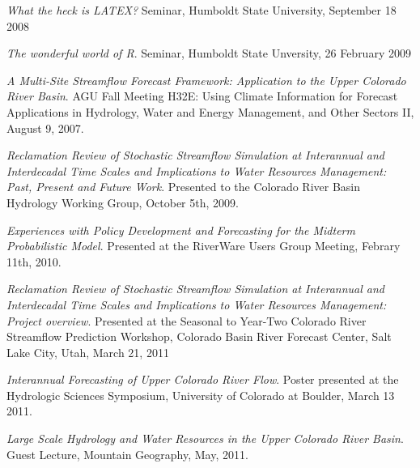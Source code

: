 \documentclass[10pt,a4paper]{scrartcl}
\begin{document}
\begin{cv}{}
        \begin{cvlist}{}\label{pres}
            \item \textit{What the heck is LATEX?} Seminar, Humboldt State University, September 18 2008
            \item \textit{The wonderful world of R}. Seminar, Humboldt State Unversity, 26 February 2009
            \item \textit{A Multi-Site Streamflow Forecast Framework: Application to the Upper Colorado River Basin}. AGU Fall Meeting H32E: Using Climate Information for Forecast Applications in Hydrology, Water and Energy Management, and Other Sectors II, August 9, 2007.
            \item \textit{Reclamation Review of Stochastic Streamflow Simulation at Interannual and Interdecadal Time Scales and Implications to Water Resources Management: Past, Present and Future Work}. Presented to the Colorado River Basin Hydrology Working Group, October 5th, 2009. 
            \item \textit{Experiences with Policy Development and Forecasting for the Midterm Probabilistic Model}. Presented at the RiverWare Users Group Meeting, Febrary 11th, 2010. 
            \item \textit{Reclamation Review of Stochastic Streamflow Simulation at Interannual and Interdecadal Time Scales and Implications to Water Resources Management: Project overview}. Presented at the Seasonal to Year-Two Colorado River Streamflow Prediction Workshop, Colorado Basin River Forecast Center, Salt Lake City, Utah, March 21, 2011
            \item \textit{Interannual Forecasting of Upper Colorado River Flow}. Poster presented at the Hydrologic Sciences Symposium, University of Colorado at Boulder, March 13 2011. 
            \item \textit{Large Scale Hydrology and Water Resources in the Upper Colorado River Basin}. Guest Lecture, Mountain Geography, May, 2011.

        \end{cvlist}
    \end{cv}
\end{document}
